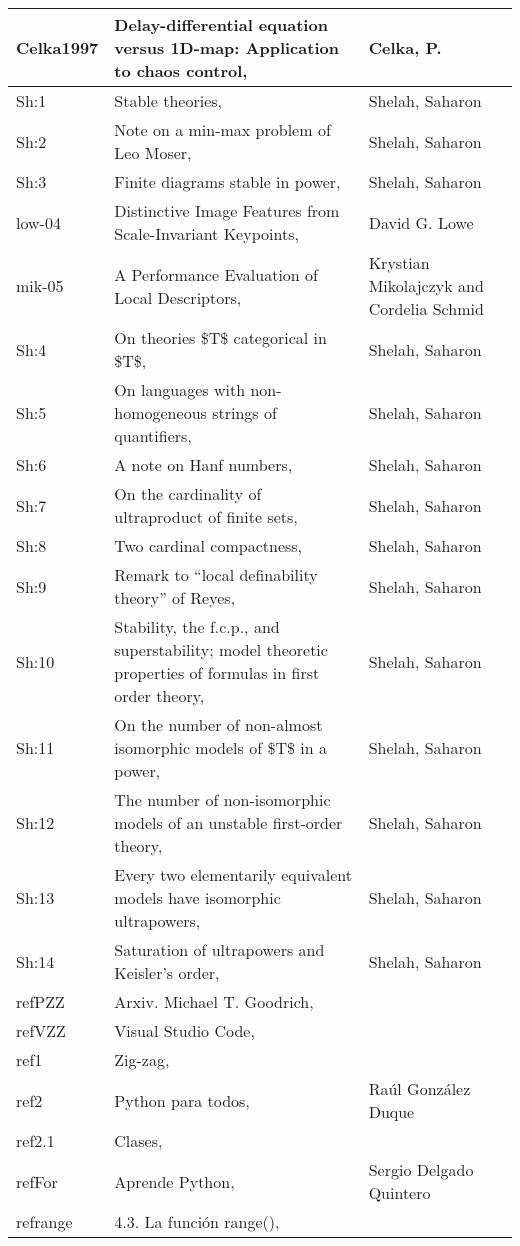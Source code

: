 \documentclass{article}
\begin{document}
\begin{longtable}{|p{}|p{}|p{}|}
\hline
Celka1997&Delay-differential equation versus 1D-map: Application to chaos control,&Celka, P.\\
\hline
Sh:1&Stable theories,&Shelah, Saharon\\
\hline
Sh:2&Note on a min-max problem of Leo Moser,&Shelah, Saharon\\
\hline
Sh:3&Finite diagrams stable in power,&Shelah, Saharon\\
\hline
low-04&Distinctive Image Features from Scale-Invariant Keypoints,&David G. Lowe\\
\hline
mik-05&A Performance Evaluation of Local Descriptors,&Krystian Mikolajczyk and Cordelia Schmid\\
\hline
Sh:4&On theories \$T\$ categorical in \$T\$,&Shelah, Saharon\\
\hline
Sh:5&On languages with non-homogeneous strings of quantifiers,&Shelah, Saharon\\
\hline
Sh:6&A note on Hanf numbers,&Shelah, Saharon\\
\hline
Sh:7&On the cardinality of ultraproduct of finite sets,&Shelah, Saharon\\
\hline
Sh:8&Two cardinal compactness,&Shelah, Saharon\\
\hline
Sh:9&Remark to ``local definability theory'' of Reyes,&Shelah, Saharon\\
\hline
Sh:10&Stability, the f.c.p., and superstability; model theoretic properties of formulas in first order theory,&Shelah, Saharon\\
\hline
Sh:11&On the number of non-almost isomorphic models of \$T\$ in a power,&Shelah, Saharon\\
\hline
Sh:12&The number of non-isomorphic models of an unstable first-order theory,&Shelah, Saharon\\
\hline
Sh:13&Every two elementarily equivalent models have isomorphic ultrapowers,&Shelah, Saharon\\
\hline
Sh:14&Saturation of ultrapowers and Keisler's order,&Shelah, Saharon\\
\hline
refPZZ&Arxiv. Michael T. Goodrich,&\\
\hline
refVZZ&Visual Studio Code,&\\
\hline
ref1&Zig-zag,&\\
\hline
ref2&Python para todos,&Raúl González Duque\\
\hline
ref2.1&Clases,&\\
\hline
refFor&Aprende Python,&Sergio Delgado Quintero\\
\hline
refrange&4.3. La función range(),&\\

\end{longtable}
\end{document}
